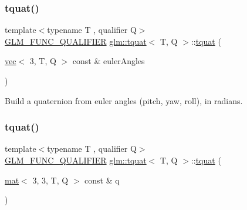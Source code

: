 \subsubsection{\texorpdfstring{tquat()}{tquat()}\hspace{0.1cm}{\footnotesize\ttfamily [8/12]}}
{\footnotesize\ttfamily template$<$typename T , qualifier Q$>$ \\
\mbox{\hyperlink{setup_8hpp_a33fdea6f91c5f834105f7415e2a64407}{G\+L\+M\+\_\+\+F\+U\+N\+C\+\_\+\+Q\+U\+A\+L\+I\+F\+I\+ER}} \mbox{\hyperlink{structglm_1_1tquat}{glm\+::tquat}}$<$ T, Q $>$\+::\mbox{\hyperlink{structglm_1_1tquat}{tquat}} (\begin{DoxyParamCaption}\item[{\mbox{\hyperlink{structglm_1_1vec}{vec}}$<$ 3, T, Q $>$ const \&}]{euler\+Angles }\end{DoxyParamCaption})}



Build a quaternion from euler angles (pitch, yaw, roll), in radians. 

\mbox{\label{structglm_1_1tquat_a38ce1c324ea9484c6d4f73785c9bea35}} 
\subsubsection{\texorpdfstring{tquat()}{tquat()}\hspace{0.1cm}{\footnotesize\ttfamily [9/12]}}
{\footnotesize\ttfamily template$<$typename T , qualifier Q$>$ \\
\mbox{\hyperlink{setup_8hpp_a33fdea6f91c5f834105f7415e2a64407}{G\+L\+M\+\_\+\+F\+U\+N\+C\+\_\+\+Q\+U\+A\+L\+I\+F\+I\+ER}} \mbox{\hyperlink{structglm_1_1tquat}{glm\+::tquat}}$<$ T, Q $>$\+::\mbox{\hyperlink{structglm_1_1tquat}{tquat}} (\begin{DoxyParamCaption}\item[{\mbox{\hyperlink{structglm_1_1mat}{mat}}$<$ 3, 3, T, Q $>$ const \&}]{q }\end{DoxyParamCaption})}

\mbox{\label{structglm_1_1tquat_adf5a3881bf63586dd6a1c26f59fee6c8}} 
